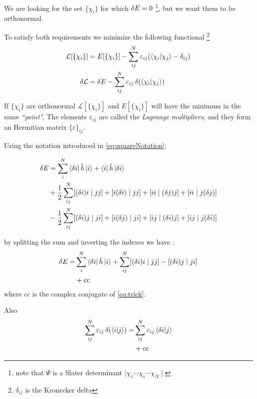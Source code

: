 \documentclass[a4paper,12pt]{article}
\begin{document}
We are looking for the set $\{\chi_i\}$ for which $\var{E} = 0$ \footnote{note that $\Psi$ is a Slater determinant $\mid \chi_1 \cdots \chi_i \cdots \chi_N \mid$}, but we want them to be orthonormal.

To satisfy both requirements we minimize the following functional \footnote{$\delta_{ij}$ is the Kronecker delta} 
\begin{align}
	\mathcal{L}[\{\chi_{i}\}] & = E[\{\chi_i\}] - \sum_{ij}^{N} \varepsilon_{ij} (\bra{\chi_{i}}\ket{\chi_{j}} - \delta_{ij})
\\
	\var{\mathcal{L}} & = \var{E} - \sum_{ij}^{N} \varepsilon_{ij} \var{(\bra{\chi_{i}}\ket{\chi_{j}})}	
\end{align}

If $\{\chi_i\}$ are orthonormal $\mathcal{L}[\{\chi_{i}\}]$ and $E[\{\chi_i\}]$ will have the minimum in the same \textit{``point"}. The elements $\varepsilon_{ij}$ are called the \textit{Lagrange multipliers}, and they form an Hermitian matrix $\{ \varepsilon \}_{ij}$.

Using the notation introduced in \eqref{eq:squareNotation}:

\begin{align}
	\var{E} 	& = \sum_{i}^{N} \bra{\var{i}} \hat{h}  \ket{i} + \bra{i} \hat{h}  \ket{\var{i}} \\
			& + \frac{1}{2} \sum_{ij}^{N} [ (\var{i})i \mid j j ] + [ i(\var{i}) \mid j j ] + [ i i \mid (\var{j}) j ] + [ i i \mid j (\var{j}) ]\\
			& - \frac{1}{2} \sum_{ij}^{N} [ (\var{i})j \mid j i ] + [ i(\var{j}) \mid j i ] + [ i j \mid (\var{i}) j ] + [ i j \mid j (\var{i}) ]
\end{align}

by splitting the sum and inverting the indexes we have \cite[p.117-119]{Attila}:
\begin{align}
	\begin{split}
	\var{E} = &  \sum_{i}^{N} \bra{\var{i}} \hat{h}  \ket{i} + \sum_{ij}^{N}  [ (\var{i})i \mid j j ] - [ (\var{i}) j \mid j i ]  \label{eq:trick} \\
	& +  cc
	\end{split}
\end{align}
where $cc$ is the complex conjugate of \eqref{eq:trick}.

Also
\begin{align}
\begin{split}
	\sum_{ij}^{N} \varepsilon_{ij} \var{(\bra{i}\ket{j})}  = & \sum_{ij}^{N} \varepsilon_{ij} \bra{\var{i}}\ket{j}  \label{eq:trick2}
	\\ & + cc
\end{split}
\end{align}
\end{document}

